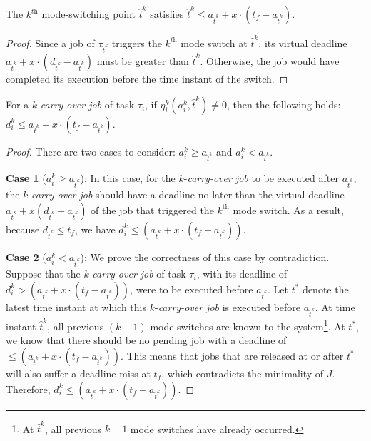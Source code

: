 \documentclass[10pt,journal,compsoc]{IEEEtran}
\begin{document}
\begin{proposition}
\label{prop:5}
The $k^{\textit{th}}$ mode-switching point $\hat{t}^k$ satisfies $\hat{t}^k\le a_{\hat{t}^k}+x\cdot{(t_f-a_{\hat{t}^k})}$.   
\end{proposition}
\begin{proof}
Since a \hi job of $\tau_{\hat{t}^{k}}$ triggers the $k^{\textit{th}}$ mode switch at $\hat{t}^{k}$, its virtual deadline ${a_{\hat{t}^{k}}+x\cdot{(d_{\hat{t}^{k}}-a_{\hat{t}^{k}})}}$ must be greater than $\hat{t}^{k}$. Otherwise, the \hi job would have completed its execution before the time instant of the switch.
\end{proof}

\begin{proposition}
\label{prop:x1}
For a $k$-\textit{carry-over job} of \lo task $\tau_i$, if $\eta_i^k(a_i^k,\hat{t}^{k})\neq{0}$, then the following holds: $d_i^k\le a_{\hat{t}^k}+x\cdot{(t_f-a_{\hat{t}^k})}$.  
\end{proposition}
\begin{proof}
There are two cases to consider: $a_i^k \ge a_{\hat{t}^k}$ and $a_i^k < a_{\hat{t}^k}$.

\noindent\textbf{Case 1} ($a_i^k \ge a_{\hat{t}^k}$):
In this case, for the $k$-\textit{carry-over job} to be executed after $a_{\hat{t}^k}$, 
the $k$-\textit{carry-over job} should have a deadline no later than the virtual deadline $a_{\hat{t}^k} +x(d_{\hat{t}^k}-a_{\hat{t}^k})$ of the \hi job that triggered the $k^{\text{th}}$ mode switch. 
As a result, because $d_{\hat{t}^k} \le t_f$, we have $d_i^k\le(a_{\hat{t}^k}+x\cdot{(t_f-a_{\hat{t}^k})})$.

\noindent\textbf{Case 2} ($a_i^k < a_{\hat{t}^k}$): We prove the correctness of this case by contradiction. Suppose that the $k$-\textit{carry-over job} of \lo task $\tau_i$, with its deadline of $d_i^k> (a_{\hat{t}^k}+x\cdot{(t_f-a_{\hat{t}^k})})$, were to be executed before $a_{\hat{t}^k}$. Let $t^*$ denote the latest 
time instant at which this $k$-\textit{carry-over job} is executed before $a_{\hat{t}^k}$. 
At time instant $\hat{t}^k$, all previous $(k-1)$ mode switches are known to the system\footnote{At $\hat{t}^k$, all previous $k-1$ mode switches have already occurred.}. 
At $t^*$, we know that there should be no pending job with a deadline of $\le (a_{\hat{t}^k}+x\cdot{(t_f-a_{\hat{t}^k})})$. This means that jobs that are released at or after $t^*$ will also suffer a deadline miss at $t_f$, which contradicts the minimality of $J$. Therefore, $d_i^k\le({a_{\hat{t}^k}+x\cdot{(t_f-a_{\hat{t}^k})}})$.
\end{proof}
\end{document}
